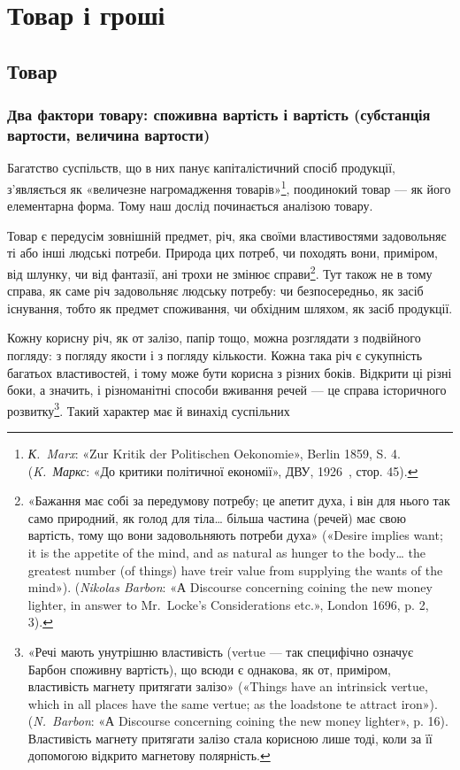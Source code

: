 
\chapter{Товар і гроші}
\section{Товар}
\subsection{Два фактори товару: споживна вартість і вартість (субстанція
вартости, величина вартости)}

Багатство суспільств, що в них панує капіталістичний спосіб
продукції, з’являється як «величезне нагромадження товарів»\footnote{
\emph{К.~Marx}: «Zur Kritik der Politischen Oekonomie», Berlin 1859,
S. 4. (\emph{K.~Маркс}: «До критики політичної економії», ДВУ, 1926~,
стор. 45).
},
поодинокий товар — як його елементарна форма. Тому наш
дослід починається аналізою товару.

Товар є передусім зовнішній предмет, річ, яка своїми властивостями
задовольняє ті або інші людські потреби. Природа цих
потреб, чи походять вони, приміром, від шлунку, чи від фантазії,
ані трохи не змінює справи\footnote{
«Бажання має собі за передумову потребу; це апетит духа, і він
для нього так само природний, як голод для тіла\dots{} більша частина (речей)
має свою вартість, тому що вони задовольняють потреби духа» («Desire
implies want; it is the appetite of the mind, and as natural as hunger to
the body\dots{} the greatest number (of things) have treir value from supplying
the wants of the mind»). (\emph{Nikolas Barbon}: «А Discourse concerning coining
the new money lighter, in answer to Mr.~Locke’s Considerations
etc.», London 1696, p. 2, 3).
}. Тут також не в тому справа, як саме
річ задовольняє людську потребу: чи безпосередньо, як засіб
існування, тобто як предмет споживання, чи обхідним шляхом,
як засіб продукції.

Кожну корисну річ, як от залізо, папір тощо, можна розглядати
з подвійного погляду: з погляду якости і з погляду кількости.
Кожна така річ є сукупність багатьох властивостей, і тому
може бути корисна з різних боків. Відкрити ці різні боки, а значить,
і різноманітні способи вживання речей — це справа історичного
розвитку\footnote{
«Речі мають унутрішню властивість (vertue — так специфічно
означує Барбон споживну вартість), що всюди є однакова, як от, приміром,
властивість магнету притягати залізо» («Things have an intrinsick vertue,
which in all places have the same vertue; as the loadstone te attract iron»).
(\emph{N.~Barbon}: «А Discourse concerning coining the new money lighter»,
p. 16). Властивість магнету притягати залізо стала корисною лише тоді,
коли за її допомогою відкрито магнетову полярність.
}. Такий характер має й винахід суспільних
\parbreak{}  %
